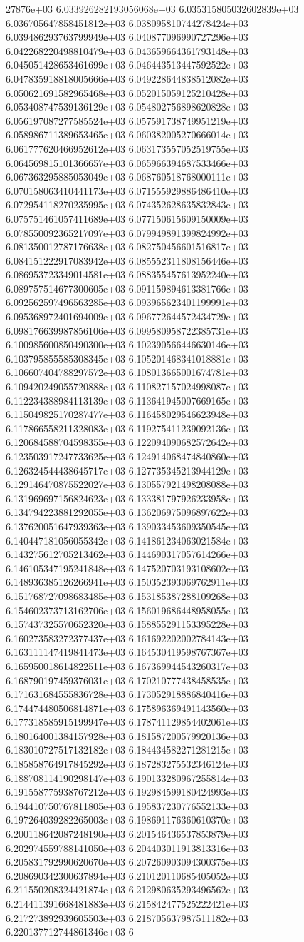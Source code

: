 27876e+03	6.033926282193056068e+03	6.035315805032602839e+03	6.036705647858451812e+03	6.038095810744278424e+03	6.039486293763799949e+03	6.040877096990727296e+03	6.042268220498810479e+03	6.043659664361793148e+03	6.045051428653461699e+03	6.046443513447592522e+03	6.047835918818005666e+03	6.049228644838512082e+03	6.050621691582965468e+03	6.052015059125210428e+03	6.053408747539136129e+03	6.054802756898620828e+03	6.056197087277585524e+03	6.057591738749951219e+03	6.058986711389653465e+03	6.060382005270666014e+03	6.061777620466952612e+03	6.063173557052519755e+03	6.064569815101366657e+03	6.065966394687533466e+03	6.067363295885053049e+03	6.068760518768000111e+03	6.070158063410441173e+03	6.071555929886486410e+03	6.072954118270235995e+03	6.074352628635832843e+03	6.075751461057411689e+03	6.077150615609150009e+03	6.078550092365217097e+03	6.079949891399824992e+03	6.081350012787176638e+03	6.082750456601516817e+03	6.084151222917083942e+03	6.085552311808156446e+03	6.086953723349014581e+03	6.088355457613952240e+03	6.089757514677300605e+03	6.091159894613381766e+03	6.092562597496563285e+03	6.093965623401199991e+03	6.095368972401694009e+03	6.096772644572434729e+03	6.098176639987856106e+03	6.099580958722385731e+03	6.100985600850490300e+03	6.102390566446630146e+03	6.103795855585308345e+03	6.105201468341018881e+03	6.106607404788297572e+03	6.108013665001674781e+03	6.109420249055720888e+03	6.110827157024998087e+03	6.112234388984113139e+03	6.113641945007669165e+03	6.115049825170287477e+03	6.116458029546623948e+03	6.117866558211328083e+03	6.119275411239092136e+03	6.120684588704598355e+03	6.122094090682572642e+03	6.123503917247733625e+03	6.124914068474840860e+03	6.126324544438645717e+03	6.127735345213944129e+03	6.129146470875522027e+03	6.130557921498208088e+03	6.131969697156824623e+03	6.133381797926233958e+03	6.134794223881292055e+03	6.136206975096897622e+03	6.137620051647939363e+03	6.139033453609350545e+03	6.140447181056055342e+03	6.141861234063021584e+03	6.143275612705213462e+03	6.144690317057614266e+03	6.146105347195241848e+03	6.147520703193108602e+03	6.148936385126266941e+03	6.150352393069762911e+03	6.151768727098683485e+03	6.153185387288109268e+03	6.154602373713162706e+03	6.156019686448958055e+03	6.157437325570652320e+03	6.158855291153395228e+03	6.160273583272377437e+03	6.161692202002784143e+03	6.163111147419841473e+03	6.164530419598767367e+03	6.165950018614822511e+03	6.167369944543260317e+03	6.168790197459376031e+03	6.170210777438458535e+03	6.171631684555836728e+03	6.173052918886840416e+03	6.174474480506814871e+03	6.175896369491143560e+03	6.177318585915199947e+03	6.178741129854402061e+03	6.180164001384157928e+03	6.181587200579920136e+03	6.183010727517132182e+03	6.184434582271281215e+03	6.185858764917845292e+03	6.187283275532346124e+03	6.188708114190298147e+03	6.190133280967255814e+03	6.191558775938767212e+03	6.192984599180424993e+03	6.194410750767811805e+03	6.195837230776552133e+03	6.197264039282265003e+03	6.198691176360610370e+03	6.200118642087248190e+03	6.201546436537853879e+03	6.202974559788141050e+03	6.204403011913813316e+03	6.205831792990620670e+03	6.207260903094300375e+03	6.208690342300637894e+03	6.210120110685405052e+03	6.211550208324421874e+03	6.212980635293496562e+03	6.214411391668481883e+03	6.215842477525222421e+03	6.217273892939605503e+03	6.218705637987511182e+03	6.220137712744861346e+03	6